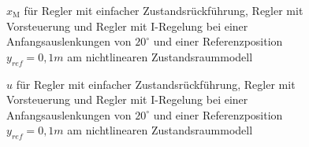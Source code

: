 \begin{figure}[H]
    \centering
    \caption[Reglervergleich für $x_{\mathrm{M}}$ (nichtlinear)]{$x_{\mathrm{M}}$ für Regler mit einfacher Zustandsrückführung, Regler mit Vorsteuerung und Regler mit I-Regelung bei einer Anfangsauslenkungen von $20^\circ$ und einer Referenzposition $y_{ref} = 0,1 m$ am nichtlinearen Zustandsraummodell}
    \label{fig:Bild41}
\end{figure}

\begin{figure}[H]
    \centering
    \caption[Reglervergleich für $u$ (nichtlinear)]{$u$ für Regler mit einfacher Zustandsrückführung, Regler mit Vorsteuerung und Regler mit I-Regelung bei einer Anfangsauslenkungen von $20^\circ$ und einer Referenzposition $y_{ref} = 0,1 m$ am nichtlinearen Zustandsraummodell}
    \label{fig:Bild42}
\end{figure}